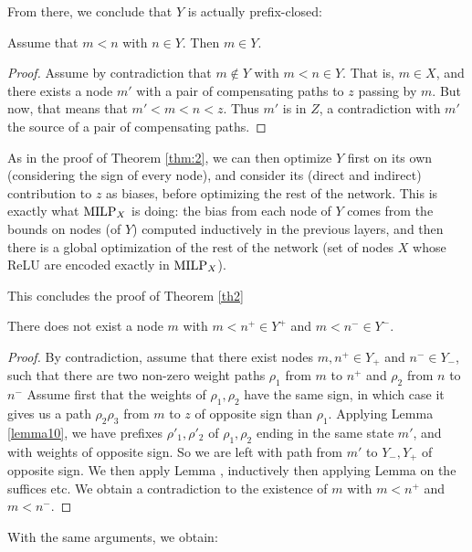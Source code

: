 From there, we conclude that $Y$ is actually prefix-closed:

\begin{lemma}
	\label{lemma12}
	Assume that $m < n$ with $n \in Y$.
	Then $m \in Y$.
\end{lemma}

\begin{proof}
Assume by contradiction that $m \notin Y$ with $m<n \in Y$.
That is, $m \in X$, and there exists a node $m'$ with a pair of compensating paths to $z$
passing by $m$. But now, that means that $m'<m<n<z$.
Thus $m'$ is in $Z$, a contradiction with $m'$ the source of a pair of compensating paths.
\end{proof}

As in the proof of Theorem \ref{thm:2}, we can then optimize $Y$ first on its own (considering the sign of every node), and consider its (direct and indirect) contribution to $z$ as biases, before optimizing the rest of the network.
This is exactly what ${\textrm{MILP}}_X$ is doing:
the bias from each node of $Y$ comes from the bounds on nodes (of $Y$) computed inductively in the previous layers, and then there is a global optimization of the rest of the network (set of nodes $X$ whose ReLU are encoded exactly in ${\textrm{MILP}}_X$).

This concludes the proof of Theorem \ref{th2}

\iffalse


\begin{lemma}
	There does not exist a node $m$ with $m<n^+ \in Y^+$ and $m<n^- \in Y^-$.
	\end{lemma}
	
	\begin{proof}
	By contradiction, assume that there exist nodes $m, n^+ \in Y_+$ and  $n^
	- \in Y_-$, such that there are two non-zero weight paths $\rho_1$ from $m$ to $n^+$ and $\rho_2$ from $n$ to $n^-$ Assume first that the weights of $\rho_1,\rho_2$ have the same sign, 
	in which case it gives us a path $\rho_2 \rho_3$  from $m$ to $z$ of opposite sign than $\rho_1$. Applying Lemma \ref{lemma10}, we have prefixes $\rho'_1,\rho'_2$ of $\rho_1,\rho_2$ ending in the same state $m'$, and with weights of opposite sign.
	So we are left with path from $m'$ to $Y_-,Y_+$ of opposite sign. 
	We then apply Lemma \label{lemma11}, inductively then applying Lemma \label{lemma10} on the suffices etc. We obtain a contradiction to the existence of $m$ with $m<n^+$ and $m<n^-$. 
	\end{proof}
	
	
	With the same arguments, we obtain:
	
